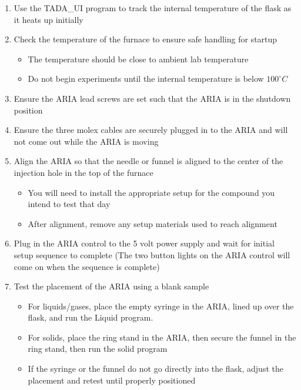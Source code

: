 \documentclass[letterpaper,11pt]{article}
\begin{document}
\begin{enumerate}
    \item Use the TADA\_UI program to track the internal temperature of the 
        flask as it heats up initially
    \item Check the temperature of the furnace to ensure safe handling for 
        startup
        \begin{itemize}
        \item The temperature should be close to ambient lab temperature
        \item Do not begin experiments until the internal temperature is below
            $100^\circ C$
        \end{itemize}
    \item Ensure the ARIA lead screws are set such that the ARIA is in the 
        shutdown position
    \item Ensure the three molex cables are securely plugged in to the ARIA and
        will not come out while the ARIA is moving
    \item Align the ARIA so that the needle or funnel is aligned to the center
        of the injection hole in the top of the furnace
        \begin{itemize}
        \item You will need to install the appropriate setup for the compound
            you intend to test that day
        \item After alignment, remove any setup materials used to reach 
            alignment
        \end{itemize}
    \item Plug in the ARIA control to the 5 volt power supply and wait for 
        initial setup sequence to complete (The two button lights on the ARIA
        control will come on when the sequence is complete)
    \item Test the placement of the ARIA using a blank sample
         \begin{itemize}
         \item For liquids/gases, place the empty syringe in the ARIA, lined up 
            over the flask, and run the Liquid program.
         \item For solids, place the ring stand in the ARIA, then secure the 
            funnel in the ring stand, then run the solid program
         \item If the syringe or the funnel do not go directly into the flask, 
            adjust the placement and retest until properly positioned
         \end{itemize}

\end{enumerate}
\end{document}
